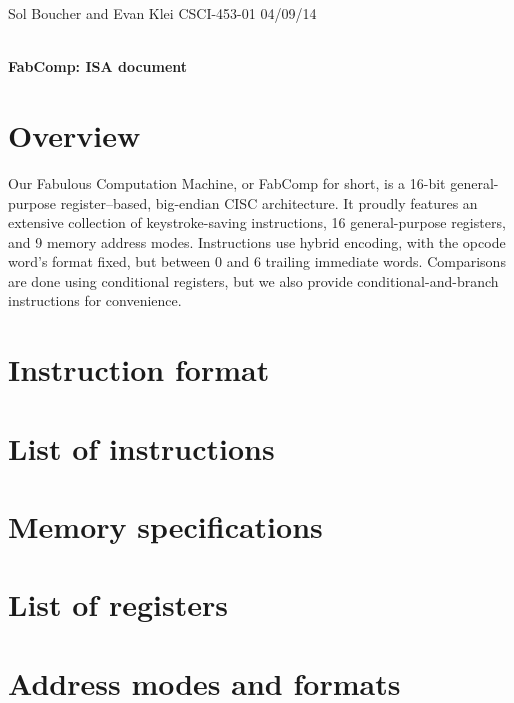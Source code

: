 \documentclass[12pt]{article}
\begin{document}
\begin{framed}
\noindent
Sol Boucher and Evan Klei \hfill CSCI-453-01 \hfill 04/09/14 \\
\vspace{6pt} \\
\centerline{\textbf{\huge FabComp: ISA document}}
\end{framed}

\section{Overview}
Our Fabulous Computation Machine, or FabComp for short, is a 16-bit general-purpose register--based, big-endian CISC architecture.
It proudly features an extensive collection of keystroke-saving instructions, 16 general-purpose registers, and 9 memory address modes.
Instructions use hybrid encoding, with the opcode word's format fixed, but between 0 and 6 trailing immediate words.
Comparisons are done using conditional registers, but we also provide conditional-and-branch instructions for convenience.

\section{Instruction format}

\section{List of instructions}

\section{Memory specifications}

\section{List of registers}

\section{Address modes and formats}
\end{document}
